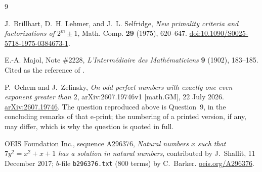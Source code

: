 \documentclass[11pt]{amsart}
\theoremstyle{remark}
\begin{document}
\begin{thebibliography}{9}

J.~Brillhart, D.~H. Lehmer, and J.~L. Selfridge,
\emph{New primality criteria and factorizations of $2^m\pm1$},
Math. Comp. \textbf{29} (1975), 620--647.
\href{https://doi.org/10.1090/S0025-5718-1975-0384673-1}%
{doi:10.1090/S0025-5718-1975-0384673-1}.

E.-A. Majol,
Note \#2228,
\emph{L'Interm\'ediaire des Math\'ematiciens} \textbf{9} (1902), 183--185.
Cited as the reference of \cite{A296376}.

P.~Ochem and J.~Zelinsky,
\emph{On odd perfect numbers with exactly one even exponent greater than $2$},
arXiv:2607.19746v1 [math.GM], 22 July 2026.
\href{https://arxiv.org/abs/2607.19746}{arXiv:2607.19746}.
The question reproduced above is Question~9, in the concluding remarks of that
e-print; the numbering of a printed version, if any, may differ, which is why
the question is quoted in full.

OEIS Foundation Inc., sequence A296376,
\emph{Natural numbers $x$ such that $7y^2=x^2+x+1$ has a solution in natural
numbers}, contributed by J.~Shallit, 11 December 2017; $b$-file
\texttt{b296376.txt} ($800$ terms) by C.~Barker.
\href{https://oeis.org/A296376}{oeis.org/A296376}.

\end{thebibliography}
\end{document}
